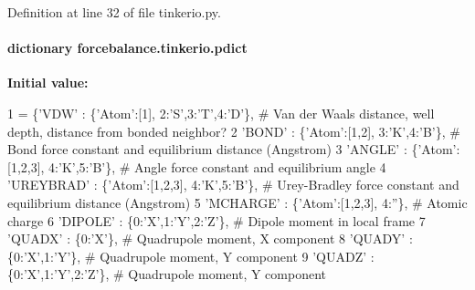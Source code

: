 Definition at line 32 of file tinkerio.\-py.

\hypertarget{namespaceforcebalance_1_1tinkerio_a714d1b926359d7d11559720e422ec34d}{
\paragraph[{pdict}]{\setlength{\rightskip}{0pt plus 5cm}dictionary forcebalance.\-tinkerio.\-pdict}}\label{namespaceforcebalance_1_1tinkerio_a714d1b926359d7d11559720e422ec34d}
{\bfseries Initial value\-:}
\begin{DoxyCode}
1 = \{\textcolor{stringliteral}{'VDW'}          : \{\textcolor{stringliteral}{'Atom'}:[1], 2:\textcolor{stringliteral}{'S'},3:\textcolor{stringliteral}{'T'},4:\textcolor{stringliteral}{'D'}\}, \textcolor{comment}{# Van der Waals distance, well depth, distance from
       bonded neighbor?}
2          \textcolor{stringliteral}{'BOND'}         : \{\textcolor{stringliteral}{'Atom'}:[1,2], 3:\textcolor{stringliteral}{'K'},4:\textcolor{stringliteral}{'B'}\},     \textcolor{comment}{# Bond force constant and equilibrium distance
       (Angstrom)}
3          \textcolor{stringliteral}{'ANGLE'}        : \{\textcolor{stringliteral}{'Atom'}:[1,2,3], 4:\textcolor{stringliteral}{'K'},5:\textcolor{stringliteral}{'B'}\},   \textcolor{comment}{# Angle force constant and equilibrium angle}
4          \textcolor{stringliteral}{'UREYBRAD'}     : \{\textcolor{stringliteral}{'Atom'}:[1,2,3], 4:\textcolor{stringliteral}{'K'},5:\textcolor{stringliteral}{'B'}\},   \textcolor{comment}{# Urey-Bradley force constant and equilibrium
       distance (Angstrom)}
5          \textcolor{stringliteral}{'MCHARGE'}       : \{\textcolor{stringliteral}{'Atom'}:[1,2,3], 4:\textcolor{stringliteral}{''}\},          \textcolor{comment}{# Atomic charge}
6          \textcolor{stringliteral}{'DIPOLE'}       : \{0:\textcolor{stringliteral}{'X'},1:\textcolor{stringliteral}{'Y'},2:\textcolor{stringliteral}{'Z'}\},             \textcolor{comment}{# Dipole moment in local frame}
7          \textcolor{stringliteral}{'QUADX'}        : \{0:\textcolor{stringliteral}{'X'}\},                         \textcolor{comment}{# Quadrupole moment, X component}
8          \textcolor{stringliteral}{'QUADY'}        : \{0:\textcolor{stringliteral}{'X'},1:\textcolor{stringliteral}{'Y'}\},                   \textcolor{comment}{# Quadrupole moment, Y component}
9          \textcolor{stringliteral}{'QUADZ'}        : \{0:\textcolor{stringliteral}{'X'},1:\textcolor{stringliteral}{'Y'},2:\textcolor{stringliteral}{'Z'}\},             \textcolor{comment}{# Quadrupole moment, Y component}

\end{DoxyCode}
